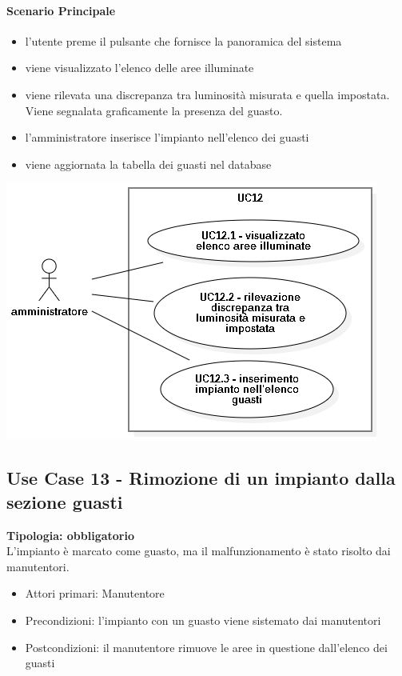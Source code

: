 \documentclass[12pt]{article}
\begin{document}
\paragraph{Scenario Principale}
\begin{itemize}
	\item l'utente preme il pulsante che fornisce la panoramica del sistema
	\item viene visualizzato l'elenco delle aree illuminate
	\item viene rilevata una discrepanza tra luminosità misurata e quella impostata. Viene segnalata graficamente la presenza del guasto.
	\item l'amministratore inserisce l'impianto nell'elenco dei guasti
	\item viene aggiornata la tabella dei guasti nel database
\end{itemize}

\includegraphics[scale=0.5]{UC12.png}

\subsection{Use Case 13 - Rimozione di un impianto dalla sezione guasti}
\textbf{Tipologia: obbligatorio} \\
L'impianto è marcato come guasto, ma il malfunzionamento è stato risolto dai manutentori.
\begin{itemize}
	\item Attori primari: Manutentore
	\item Precondizioni: l'impianto con un guasto viene sistemato dai manutentori
	\item Postcondizioni: il manutentore rimuove le aree in questione dall'elenco dei guasti
\end{itemize}
\end{document}
